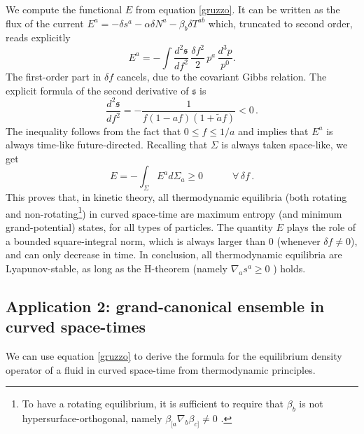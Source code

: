 \documentclass[a4paper, amsfonts, amssymb, amsmath, reprint, showkeys, nofootinbib, twoside, onecolumn,notitlepage]{revtex4-1}
\newcommand{\spc}{\quad \quad \quad}
\begin{document}
We compute the functional $E$ from equation \eqref{gruzzo}. It can be written as the flux of the current $E^a=-\delta s^a -\alpha \delta N^a -\beta_b \delta T^{ab}$ which, truncated to second order, reads explicitly
\begin{equation}
    E^a = - \int \dfrac{d^2 \mathfrak{s}}{d f^2} \, \dfrac{\delta f^2}{2} \, p^a \, \dfrac{ d^3 p}{p^0}.
\end{equation}
The first-order part in $\delta f$ cancels, due to the covariant Gibbs relation. The explicit formula of the second derivative of $\mathfrak{s}$ is
\begin{equation}
 \dfrac{d^2 \mathfrak{s}}{d f^2} = - \dfrac{1}{f(1-af)(1+\tilde{a}f)} < 0 \, .
\end{equation}
The inequality follows from the fact that $0 \leq f \leq 1/a$ \cite{WuAnyons1994} and implies that $E^a$ is always time-like future-directed. Recalling that $\Sigma$ is always taken space-like, we get
\begin{equation}
E = -\int_\Sigma E^a d \Sigma_a \geq 0 \spc \forall \, \delta f \, .
\end{equation}
This proves that, in kinetic theory, all thermodynamic equilibria (both rotating and non-rotating\footnote{To have a rotating equilibrium, it is sufficient to require that $\beta_b$ is not hypersurface-orthogonal, namely $\beta_{[a} \nabla_b \beta_{c]}\neq 0$ \cite{Wald}.}) in curved space-time are maximum entropy (and minimum grand-potential) states, for all types of particles. The quantity $E$ plays the role of a bounded square-integral norm, which is always larger than 0 (whenever $\delta f \neq 0$), and can only decrease in time. In conclusion, all thermodynamic equilibria are Lyapunov-stable, as long as the H-theorem (namely $\nabla_a s^a \geq 0$ \cite{cercignani_book}) holds.





\subsection{Application 2: grand-canonical ensemble in curved space-times}

We can use equation \eqref{gruzzo} to derive the formula for the equilibrium density operator of a fluid in curved space-time from thermodynamic principles.
\end{document}
